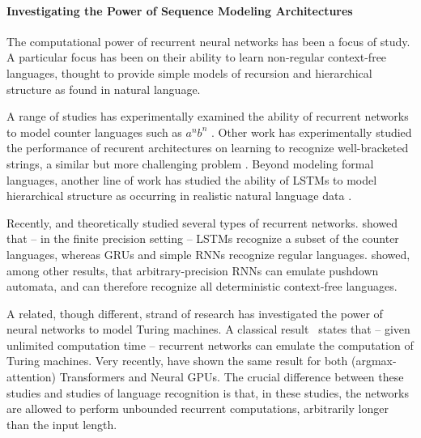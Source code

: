 \documentclass[11pt,a4paper]{article}
\begin{document}
\paragraph{Investigating the Power of Sequence Modeling Architectures}
The computational power of recurrent neural networks has been a focus of study.
A particular focus has been on their ability to learn non-regular context-free languages, thought to provide simple models of recursion and hierarchical structure as found in natural language.

A range of studies has experimentally examined the ability of recurrent networks to model counter languages such as $a^nb^n$ \cite{kalinke1998computation,gers2001lstm,cartling2008implicit,weiss2018practical,suzgun2019evaluating}.
Other work has experimentally studied the performance of recurent architectures on learning to recognize well-bracketed strings, a similar but more challenging problem \cite{sennhauser2018evaluating,skachkova2018closing,bernardy2018can}.
Beyond modeling formal languages, another line of work has studied the ability of LSTMs to model hierarchical structure as occurring in realistic natural language data \cite{linzen2016assessing,gulordava2018colorless}.

Recently, \citet{merrill2019sequential} and \citet{korsky2019computational} theoretically studied several types of recurrent networks. \citet{merrill2019sequential} showed that -- in the finite precision setting -- LSTMs recognize a subset of the counter languages, whereas GRUs and simple RNNs recognize regular languages.
\citet{korsky2019computational} showed, among other results, that arbitrary-precision RNNs can emulate pushdown automata, and can therefore recognize all deterministic context-free languages.


A related, though different, strand of research has investigated the power of neural networks to model Turing machines.
A classical result~\cite{siegelman1991neural} states that -- given unlimited computation time -- recurrent networks can emulate the computation of Turing machines.
Very recently, \citet{perez2019turing} have shown the same result for both (argmax-attention) Transformers and Neural GPUs.
The crucial difference between these studies and studies of language recognition is that, in these studies, the networks are allowed to perform unbounded recurrent computations, arbitrarily longer than the input length.
\end{document}
